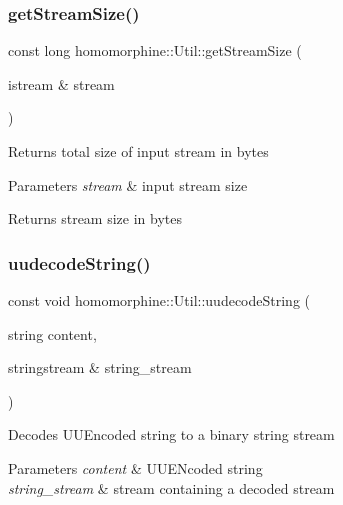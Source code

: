 \subsubsection{\texorpdfstring{getStreamSize()}{getStreamSize()}}
{\footnotesize\ttfamily const long homomorphine\+::\+Util\+::get\+Stream\+Size (\begin{DoxyParamCaption}\item[{istream \&}]{stream }\end{DoxyParamCaption})\hspace{0.3cm}{\ttfamily [static]}}

Returns total size of input stream in bytes


\begin{DoxyParams}{Parameters}
{\em stream} & input stream size \\
\hline
\end{DoxyParams}
\begin{DoxyReturn}{Returns}
stream size in bytes 
\end{DoxyReturn}
\mbox{\label{classhomomorphine_1_1_util_aba5af6d7356aca8c70ae4fb1e5d36b70}} 
\subsubsection{\texorpdfstring{uudecodeString()}{uudecodeString()}}
{\footnotesize\ttfamily const void homomorphine\+::\+Util\+::uudecode\+String (\begin{DoxyParamCaption}\item[{string}]{content,  }\item[{stringstream \&}]{string\+\_\+stream }\end{DoxyParamCaption})\hspace{0.3cm}{\ttfamily [static]}}

Decodes U\+U\+Encoded string to a binary string stream


\begin{DoxyParams}{Parameters}
{\em content} & U\+U\+E\+Ncoded string \\
\hline
{\em string\+\_\+stream} & stream containing a decoded stream \\
\hline
\end{DoxyParams}
\mbox{\label{classhomomorphine_1_1_util_a26f29995aa48f4374993ec4afeca2ac8}} 
